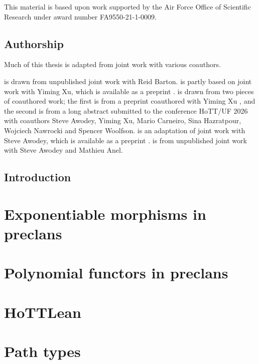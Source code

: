 \documentclass[11pt]{report}
\theoremstyle{definition}
\theoremstyle{plain}
\newcommand{\Cat}{\mathsf{Cat}}
\begin{document}
This material is based upon work supported by the
Air Force Office of Scientific Research under award number FA9550-21-1-0009.

\newpage
\section*{Authorship}

Much of this thesis is adapted from joint work with various coauthors.

 is drawn from unpublished joint work with Reid Barton.
 is partly based on joint work with Yiming Xu,
which is available as a preprint \cite{hua2026}.
 is drawn from two pieces of coauthored work;
the first is from a preprint coauthored with Yi\-ming Xu \cite{hua2026},
and the second is from a long abstract submitted to the conference HoTT/UF 2026
\cite{hottuf2026} with coauthors Steve Awodey, Yiming Xu, Mario Carneiro, Sina Hazratpour,
Wojciech Nawrocki and Spencer Woolfson.
 is an adaptation of joint work with Steve Awodey,
which is available as a preprint \cite{awodey2026}.
 is from unpublished joint work with Steve Awodey and Mathieu Anel.

\newpage
\section*{Introduction}


\chapter{Exponentiable morphisms in preclans}\label{sec:exponentiable}

\chapter{Polynomial functors in preclans}\label{sec:polynomials}


\chapter{HoTTLean}\label{sec:hottlean}


\chapter{Path types}\label{sec:path-types}

\end{document}
